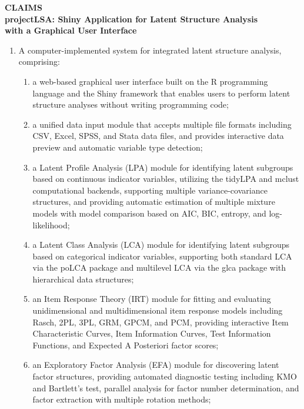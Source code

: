 \documentclass[12pt,a4paper]{article}
\begin{document}
\begin{center}
\textbf{\large CLAIMS}\\[12pt]
\textbf{projectLSA: Shiny Application for Latent Structure Analysis\\with a Graphical User Interface}
\end{center}

\vspace{12pt}

\begin{enumerate}[leftmargin=3em, labelsep=1em, itemsep=12pt]

\item A computer-implemented system for integrated latent structure analysis, comprising:
\begin{enumerate}[label=\alph*., leftmargin=2em, itemsep=2pt]
\item a web-based graphical user interface built on the R programming language and the Shiny framework that enables users to perform latent structure analyses without writing programming code;
\item a unified data input module that accepts multiple file formats including CSV, Excel, SPSS, and Stata data files, and provides interactive data preview and automatic variable type detection;
\item a Latent Profile Analysis (LPA) module for identifying latent subgroups based on continuous indicator variables, utilizing the tidyLPA and mclust computational backends, supporting multiple variance-covariance structures, and providing automatic estimation of multiple mixture models with model comparison based on AIC, BIC, entropy, and log-likelihood;
\item a Latent Class Analysis (LCA) module for identifying latent subgroups based on categorical indicator variables, supporting both standard LCA via the poLCA package and multilevel LCA via the glca package with hierarchical data structures;
\item an Item Response Theory (IRT) module for fitting and evaluating unidimensional and multidimensional item response models including Rasch, 2PL, 3PL, GRM, GPCM, and PCM, providing interactive Item Characteristic Curves, Item Information Curves, Test Information Functions, and Expected A Posteriori factor scores;
\item an Exploratory Factor Analysis (EFA) module for discovering latent factor structures, providing automated diagnostic testing including KMO and Bartlett's test, parallel analysis for factor number determination, and factor extraction with multiple rotation methods;

\end{enumerate}
\end{enumerate}
\end{document}
